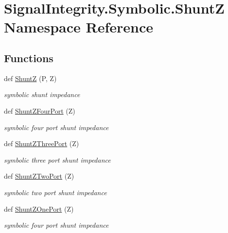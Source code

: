\hypertarget{namespaceSignalIntegrity_1_1Symbolic_1_1ShuntZ}{}\section{Signal\+Integrity.\+Symbolic.\+ShuntZ Namespace Reference}
\label{namespaceSignalIntegrity_1_1Symbolic_1_1ShuntZ}
\subsection*{Functions}
\begin{DoxyCompactItemize}
\item 
def \hyperlink{namespaceSignalIntegrity_1_1Symbolic_1_1ShuntZ_ab32ac03d15bb51423a95fdfaefb764f5}{ShuntZ} (P, Z)
\begin{DoxyCompactList}\small\item\em symbolic shunt impedance \end{DoxyCompactList}\item 
def \hyperlink{namespaceSignalIntegrity_1_1Symbolic_1_1ShuntZ_a0516bd7ba5f76dc0247fd30f6aacdffc}{Shunt\+Z\+Four\+Port} (Z)
\begin{DoxyCompactList}\small\item\em symbolic four port shunt impedance \end{DoxyCompactList}\item 
def \hyperlink{namespaceSignalIntegrity_1_1Symbolic_1_1ShuntZ_a58498d6d446784d31ce6915a18059b2b}{Shunt\+Z\+Three\+Port} (Z)
\begin{DoxyCompactList}\small\item\em symbolic three port shunt impedance \end{DoxyCompactList}\item 
def \hyperlink{namespaceSignalIntegrity_1_1Symbolic_1_1ShuntZ_af01ac02bd83d6d68a7e06134f2a2f4c5}{Shunt\+Z\+Two\+Port} (Z)
\begin{DoxyCompactList}\small\item\em symbolic two port shunt impedance \end{DoxyCompactList}\item 
def \hyperlink{namespaceSignalIntegrity_1_1Symbolic_1_1ShuntZ_abfb38e200fbf919b34ba4e0d78fee0da}{Shunt\+Z\+One\+Port} (Z)
\begin{DoxyCompactList}\small\item\em symbolic four port shunt impedance \end{DoxyCompactList}\end{DoxyCompactItemize}


